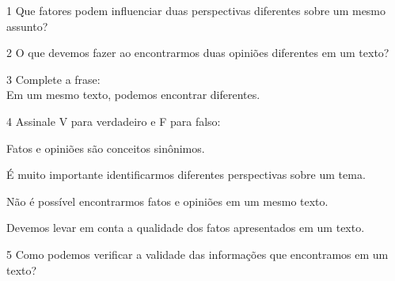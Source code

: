 
\num{1} Que fatores podem influenciar duas perspectivas diferentes sobre um
mesmo assunto?



\num{2} O que devemos fazer ao encontrarmos duas opiniões diferentes em um texto?



\num{3} Complete a frase:\\
Em um mesmo texto, podemos encontrar \preencher diferentes.


\num{4} Assinale V para verdadeiro e F para falso:

\begin{boxlist}
\item Fatos e opiniões são conceitos sinônimos. 

\item É muito importante identificarmos diferentes perspectivas sobre um
tema. 

\item Não é possível encontrarmos fatos e opiniões em um mesmo texto. 

\item Devemos levar em conta a qualidade dos fatos apresentados em um
texto. 
\end{boxlist}

\num{5} Como podemos verificar a validade das informações que encontramos em um texto?





